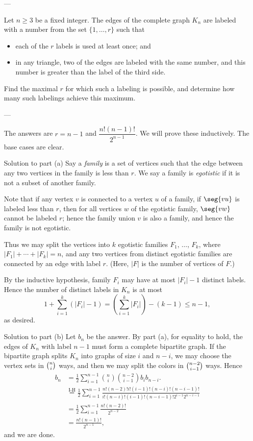 
---

Let $n\ge3$ be a fixed integer. The edges of the complete graph $K_n$ are labeled with a number from the set $\{1,\ldots,r\}$ such that
\begin{itemize}
    \item each of the $r$ labels is used at least once; and
    \item in any triangle, two of the edges are labeled with the same number, and this number is greater than the label of the third side.
\end{itemize}
Find the maximal $r$ for which such a labeling is possible, and determine how many such labelings achieve this maximum.

---

The answers are $r=n-1$ and $\dfrac{n!(n-1)!}{2^{n-1}}$. We will prove these inductively. The base cases are clear.
\begin{customenv}{Solution to part (a)}
    Say a \emph{family} is a set of vertices such that the edge between any two vertices in the family is less than $r$. We say a family is \emph{egotistic} if it is not a subset of another family.

    Note that if any vertex $v$ is connected to a vertex $u$ of a family, if $\seg{vu}$ is labeled less than $r$, then for all vertices $w$ of the egotistic family, $\seg{vw}$ cannot be labeled $r$; hence the family union $v$ is also a family, and hence the family is not egotistic.

    Thus we may split the vertices into $k$ egotistic families $F_1$, $\ldots$, $F_k$, where $|F_1|+\cdots+|F_k|=n$, and any two vertices from distinct egotistic families are connected by an edge with label $r$. (Here, $|F|$ is the number of vertices of $F$.)

    By the inductive hypothesis, family $F_i$ may have at most $|F_i|-1$ distinct labels. Hence the number of distinct labels in $K_n$ is at most \[1+\sum_{i=1}^k(|F_i|-1)=\left(\sum_{i=1}^k|F_i|\right)-(k-1)\le n-1,\]
    as desired.
\end{customenv}
\begin{customenv}{Solution to part (b)}
    Let $b_n$ be the answer. By part (a), for equality to hold, the edges of $K_n$ with label $n-1$ must form a complete bipartite graph. If the bipartite graph splits $K_n$ into graphs of size $i$ and $n-i$, we may choose the vertex sets in $\tbinom ni$ ways, and then we may split the colors in $\tbinom{n-2}{i-1}$ ways. Hence
    \begin{align*}
        b_n&=\frac12\sum_{i=1}^{n-1}\binom ni\binom{n-2}{i-1}b_ib_{n-i}.\\
        &\stackrel{\text{I-H}}=\frac12\sum_{i=1}^{n-1}\frac{n!(n-2)!i!(i-1)!(n-i)!(n-i-1)!}{i!(n-i)!(i-1)!(n-i-1)!2^{i-1}2^{n-i-1}}\\
        &=\frac12\sum_{i=1}^{n-1}\frac{n!(n-2)!}{2^{n-2}}\\
        &=\frac{n!(n-1)!}{2^{n-1}},
    \end{align*}
    and we are done.
\end{customenv}

